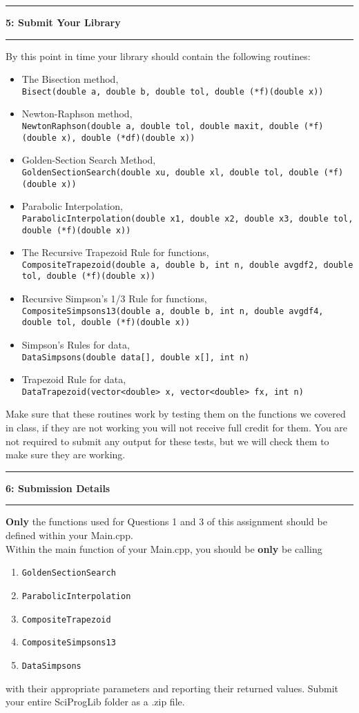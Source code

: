 \documentclass[11pt]{article}
\newcommand\question[2]{\vspace{.25in}\hrule\textbf{#1: #2}\vspace{.5em}\hrule\vspace{.10in}}
\begin{document}
\newpage
\question{5}{Submit Your Library  }
By this point in time your library should contain the following routines:
\begin{itemize}
	\item The Bisection method, \\\texttt{Bisect(double a, double b, double tol, double (*f)(double x))}
	\item Newton-Raphson method, \\\texttt{NewtonRaphson(double a, double tol, double maxit, double (*f)(double x), double (*df)(double x))}
	\item Golden-Section Search Method, \\\texttt{GoldenSectionSearch(double xu, double xl, double tol, double (*f)(double x))}
	\item Parabolic Interpolation, \\\texttt{ParabolicInterpolation(double x1, double x2, double x3, double tol, double (*f)(double x))}
	\item The Recursive Trapezoid Rule for functions, \\\texttt{CompositeTrapezoid(double a, double b, int n, double avgdf2, double tol, double (*f)(double x))}
	\item Recursive Simpson's 1/3 Rule for functions, \\\texttt{CompositeSimpsons13(double a, double b, int n, double avgdf4, double tol, double (*f)(double x))}
	\item Simpson's Rules for data, \\\texttt{DataSimpsons(double data[], double x[], int n)}
	\item Trapezoid Rule for data, \\\texttt{DataTrapezoid(vector<double> x, vector<double> fx, int n)}
\end{itemize}
Make sure that these routines work by testing them on the functions we covered in class, if they are not working you will not receive full credit for them. You are not required to submit any output for these tests, but we will check them to make sure they are working. 

\question{6}{Submission Details}
\textbf{Only} the functions used for Questions 1 and 3 of this assignment should be defined within your Main.cpp.\\\vspace{5pt}
Within the main function of your Main.cpp, you should be \textbf{only} be calling
\begin{enumerate}
	\item \texttt{GoldenSectionSearch}
	\item \texttt{ParabolicInterpolation}
	\item \texttt{CompositeTrapezoid}
	\item \texttt{CompositeSimpsons13}
	\item \texttt{DataSimpsons}
\end{enumerate}
with their appropriate parameters and reporting their returned values. Submit your entire SciProgLib folder as a .zip file.
\end{document}
